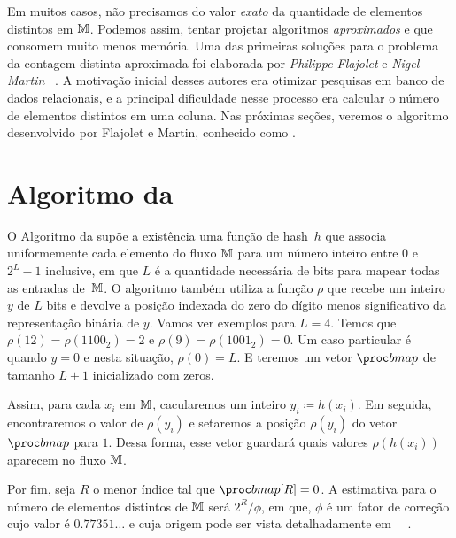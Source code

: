 Em muitos casos, não precisamos do valor \textit{exato} da quantidade de elementos distintos em $\mathbb{M}$. Podemos assim, 
tentar projetar algoritmos \textit{aproximados} e que consomem muito menos memória. Uma das primeiras soluções para o 
problema da contagem distinta aproximada foi elaborada por \textit{Philippe Flajolet} e \textit{Nigel Martin}
~\citep{flajolet:martin:85}. A motivação inicial desses autores era otimizar pesquisas em banco de dados relacionais, e 
a principal dificuldade nesse processo era calcular o número de elementos distintos em uma coluna. Nas próximas seções, 
veremos o algoritmo desenvolvido por Flajolet e Martin, conhecido como .

\section{Algoritmo da }
\label{sec:flajolet-martin:algorithm}

O Algoritmo da  supõe a existência uma função de hash~$h$ que associa uniformemente cada 
elemento do fluxo $\mathbb{M}$ para um número inteiro entre $0$ e $2^L-1$ inclusive, em que $L$ é a quantidade necessária de 
bits para mapear todas as entradas de~$\mathbb{M}$. O algoritmo também utiliza a função $\rho$ que recebe um inteiro $y$ de 
$L$ bits e devolve a posição indexada do zero do dígito menos significativo da representação binária de $y$. Vamos ver 
exemplos para $L = 4$. Temos que $\rho(12) = \rho(1100_2) = 2$ e $\rho(9) = \rho(1001_2) = 0$. Um caso particular é 
quando $y = 0$ e nesta situação, $\rho(0) = L$. E teremos um vetor $\bitmap$ de tamanho $L + 1$ inicializado com zeros.

Assim, para cada $x_i$ em $\mathbb{M}$, cacularemos um inteiro $y_i \coloneqq h(x_i)$. Em seguida, encontraremos o valor de 
$\rho(y_i)$ e setaremos a posição $\rho(y_i)$ do vetor $\bitmap$ para $1$. Dessa forma, esse vetor guardará quais valores 
$\rho(h(x_i))$ aparecem no fluxo $\mathbb{M}$.

Por fim, seja $R$ o menor índice tal que $\bitmap[R] = 0$. A estimativa para o número de elementos distintos de 
$\mathbb{M}$ será $2^R/\phi$, em que, $\phi$ é um fator de correção cujo valor é $0.77351{\dots}$ e cuja origem pode ser vista
detalhadamente em ~~\citep{flajolet:martin:85}.

